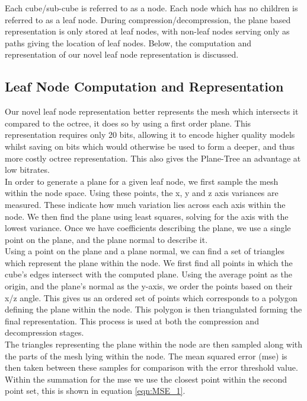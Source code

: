 Each cube/sub-cube is referred to as a node. Each node which has no children is referred to as a leaf node. During compression/decompression, the plane based representation is only stored at leaf nodes, with non-leaf nodes serving only as paths giving the location of leaf nodes. Below, the computation and representation of our novel leaf node representation is discussed. \\

\subsection{Leaf Node Computation and Representation}
\label{NRep}

Our novel leaf node representation better represents the mesh which intersects it compared to the octree, it does so by using a first order plane. This representation requires only 20 bits, allowing it to encode higher quality models whilst saving on bits which would otherwise be used to form a deeper, and thus more costly octree representation. This also gives the Plane-Tree an advantage at low bitrates. \\

In order to generate a plane for a given leaf node, we first sample the mesh within the node space. Using these points, the x, y and z axis variances are measured. These indicate how much variation lies across each axis within the node. We then find the plane using least squares, solving for the axis with the lowest variance. Once we have coefficients describing the plane, we use a single point on the plane, and the plane normal to describe it. \\

Using a point on the plane and a plane normal, we can find a set of triangles which represent the plane within the node. We first find all points in which the cube's edges intersect with the computed plane. Using the average point as the origin, and the plane's normal as the y-axis, we order the points based on their x/z angle. This gives us an ordered set of points which corresponds to a polygon defining the plane within the node. This polygon is then triangulated forming the final representation. This process is used at both the compression and decompression stages. \\

The triangles representing the plane within the node are then sampled along with the parts of the mesh lying within the node. The mean squared error (mse) is then taken between these samples for comparison with the error threshold value. Within the summation for the mse we use the closest point within the second point set, this is shown in equation \ref{eqn:MSE_1}.


